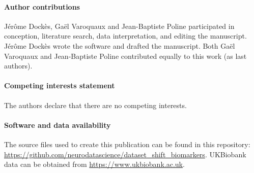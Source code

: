 \documentclass[twocolumn]{article}
\begin{document}
\paragraph{Author contributions}
Jérôme Dockès, Gaël Varoquaux and Jean-Baptiste Poline participated in
conception, literature search, data interpretation, and editing the manuscript.
Jérôme Dockès wrote the software and drafted the manuscript. Both Gaël Varoquaux
and Jean-Baptiste Poline contributed equally to this work (as last authors).

\paragraph{Competing interests statement}
The authors declare that there are no competing interests.

\paragraph{Software and data availability}
The source files used to create this publication can be found in this repository:
\url{https://github.com/neurodatascience/dataset_shift_biomarkers}.
%
UKBiobank data can be obtained from \url{https://www.ukbiobank.ac.uk}.



\appendix
\end{document}
